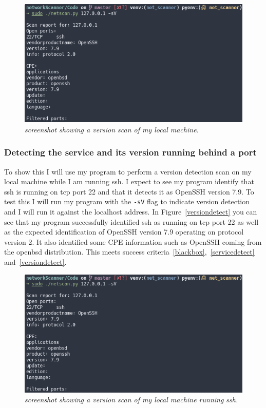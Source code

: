 \documentclass[titlepage]{article}
\let\Oldsubsubsection\subsubsection{}
\renewcommand{\subsubsection}{\FloatBarrier\Oldsubsubsection}
\begin{document}
\begin{figure}[H]
  \centering
  \includegraphics[width=\textwidth]{sshversiondetect.png}
  \caption{\textit{%
    screenshot showing a version scan of my local machine.
}}\label{sshversiondetect}
\end{figure}

\subsubsection{Detecting the service and its version running behind a port}\label{test:versiondetect}
To show this I will use my program to perform a version detection scan on my local machine
while I am running \gls{ssh}. I expect to see my program identify that \gls{ssh} is running
on \gls{tcp} port 22 and that it detects it as OpenSSH version 7.9. To test this
I will run my program with the \verb|-sV| flag to indicate version detection and
I will run it against the localhost address. In Figure~\ref{versiondetect}
you can see that my program successfully identified \gls{ssh} as running on
\gls{tcp} port 22 as well as the expected identification of OpenSSH version 7.9
operating on protocol version 2.
It also identified some CPE information such as OpenSSH coming from the openbsd
distribution.
This meets success criteria~\ref{blackbox},~\ref{servicedetect} and~\ref{versiondetect}.

\begin{figure}[H]
  \centering
  \includegraphics[width=\textwidth]{sshversiondetect.png}
  \caption{\textit{%
    screenshot showing a version scan of my local machine running ssh.
}}\label{versiondetecttest}
\end{figure}
\end{document}
